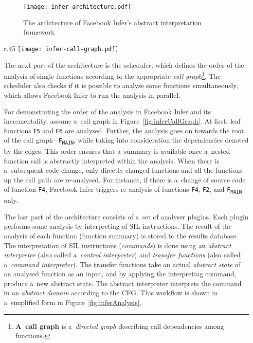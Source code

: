 \begin{figure}[hbt]
    \centering
    \texttt{[image: infer-architecture.pdf]}
    \caption{%
        The architecture of Facebook Infer's abstract interpretation
        framework~\cite{inferAISpeech, harmimBP}
    }
    \label{fig:inferArch}
\end{figure}

\begin{wrapfigure}{r}{.45 \linewidth}
    \centering
    \vspace{-1em}
    \texttt{[image: infer-call-graph.pdf]}
    \caption{%
        A~call graph for an illustration of Facebook Infer's
        analysis process~\cite{inferAISpeech, harmimBP}
    }
    \label{fig:inferCallGraph}
\end{wrapfigure}
The next part of the architecture is the scheduler, which defines the
order of the analysis of single functions according to the appropriate
\emph{call graph}\footnote{\textbf{A~call graph} is a~\emph{directed graph}
describing call dependencies among functions.}. The scheduler also checks
if it is possible to analyse some functions simultaneously, which allows
Facebook Infer to run the analysis in parallel.

\begin{example}
    For demonstrating the order of the analysis in Facebook Infer and its
    incrementality, assume a~call graph in Figure~\ref{fig:inferCallGraph}.
    At first, leaf functions \texttt{F5} and \texttt{F6} are analysed.
    Further, the analysis goes on towards the root of the call
    graph\,--\,\texttt{F\textsubscript{MAIN}}, while taking into
    consideration the dependencies denoted by the edges. This order ensures
    that a~summary is available once a~nested function call is abstractly
    interpreted within the analysis. When there is a~subsequent code change,
    only directly changed functions and all the functions up the call path
    are re-analysed. For instance, if there is a~change of source code of
    function \texttt{F4}, Facebook Infer triggers re-analysis of
    functions \texttt{F4}, \texttt{F2}, and \texttt{F\textsubscript{MAIN}}
    only.
\end{example}

The last part of the architecture consists of a~set of analyser plugins.
Each plugin performs some analysis by interpreting of SIL instructions.
The result of the analysis of each function (function summary) is stored to
the results database. The interpretation of SIL instructions (\emph{commands})
is done using an \emph{abstract interpreter} (also called a~\emph{control
interpreter}) and \emph{transfer functions} (also called a~\emph{command
interpreter}). The transfer functions take an actual \emph{abstract state}
of an analysed function as an input, and by applying the interpreting command,
produce a~new abstract state. The abstract interpreter interprets the
command in an \emph{abstract domain} according to the CFG. This workflow is
shown in a~simplified form in Figure~\ref{fig:inferAnalysis}.

